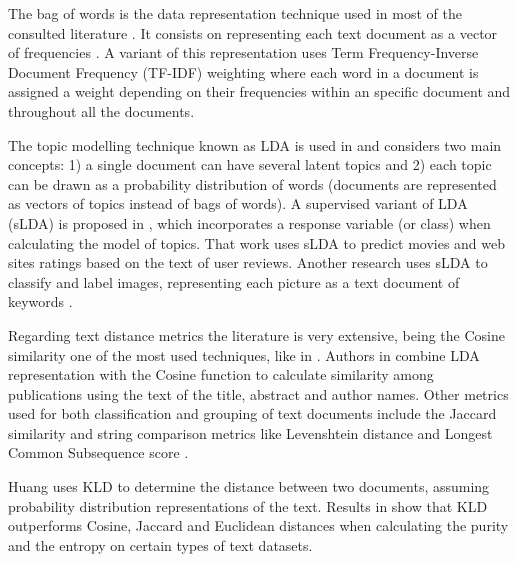 \documentclass[preprint,12pt,3p]{elsarticle}
\begin{document}
The bag of words is the data representation technique used in most of the consulted literature \cite{aggarwal2015data,soto2015similarity,kumaran2004text,xu2012combining,srivastava2009text, lazar2014improving}. It consists on representing each text document as a vector of frequencies \cite{aggarwal2015data}. A variant of this representation uses Term Frequency-Inverse Document Frequency (TF-IDF) weighting \cite{araki2014annotation,soto2015similarity} where each word in a document is assigned a weight depending on their frequencies within an specific document and throughout all the documents.\par

The topic modelling technique known as LDA is used in \cite{lazar2014improving,bae2014computing} and considers two main concepts: 1) a single document can have several latent topics and 2) each topic can be drawn as a probability distribution of words (documents are represented as vectors of topics instead of bags of words). A supervised variant of LDA (sLDA) is proposed in \cite{mcauliffe2008supervised}, which incorporates a response variable (or class) when calculating the model of topics. That work uses sLDA to predict movies and web sites ratings based on the text of user reviews. Another research uses sLDA to classify and label images, representing each picture as a text document of keywords \cite{chong2009simultaneous}.\par

Regarding text distance metrics the literature is very extensive, being the Cosine similarity one of the most used techniques, like in \cite{liebman2016capturing,soto2015similarity}. Authors in \cite{bae2014computing} combine LDA representation with the Cosine function to calculate similarity among publications using the text of the title, abstract and author names. Other metrics used for both classification and grouping of text documents include the Jaccard similarity \cite{liebman2016capturing,soto2015similarity} and string comparison metrics like Levenshtein distance \cite{gong2009matching, treeratpituk2012name} and Longest Common Subsequence score \cite{islam2008semantic, soto2015similarity}.\par

Huang \cite{huang2008similarity} uses KLD to determine the distance between two documents, assuming probability distribution representations of the text. Results in \cite{huang2008similarity, metzler2007similarity} show that KLD outperforms Cosine, Jaccard and Euclidean distances when calculating the purity and the entropy on certain types of text datasets.\par
\end{document}
